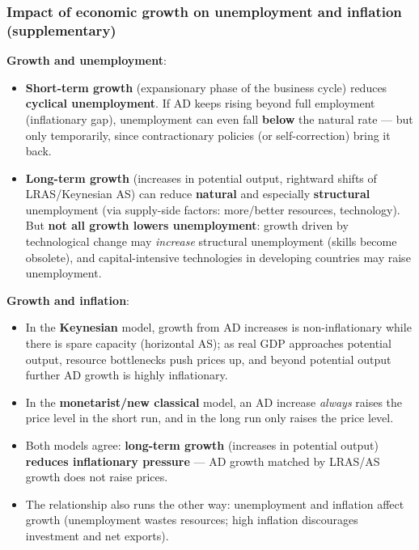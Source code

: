 \documentclass[a4paper,12pt]{article}
\begin{document}
\subsubsection*{Impact of economic growth on unemployment and inflation (supplementary)}
\textbf{Growth and unemployment}:
\begin{itemize}
  \item \textbf{Short-term growth} (expansionary phase of the business cycle) reduces \textbf{cyclical unemployment}. If AD keeps rising beyond full employment (inflationary gap), unemployment can even fall \textbf{below} the natural rate --- but only temporarily, since contractionary policies (or self-correction) bring it back.
  \item \textbf{Long-term growth} (increases in potential output, rightward shifts of LRAS/Keynesian AS) can reduce \textbf{natural} and especially \textbf{structural} unemployment (via supply-side factors: more/better resources, technology). But \textbf{not all growth lowers unemployment}: growth driven by technological change may \textit{increase} structural unemployment (skills become obsolete), and capital-intensive technologies in developing countries may raise unemployment.
\end{itemize}
\textbf{Growth and inflation}:
\begin{itemize}
  \item In the \textbf{Keynesian} model, growth from AD increases is non-inflationary while there is spare capacity (horizontal AS); as real GDP approaches potential output, resource bottlenecks push prices up, and beyond potential output further AD growth is highly inflationary.
  \item In the \textbf{monetarist/new classical} model, an AD increase \textit{always} raises the price level in the short run, and in the long run only raises the price level.
  \item Both models agree: \textbf{long-term growth} (increases in potential output) \textbf{reduces inflationary pressure} --- AD growth matched by LRAS/AS growth does not raise prices.
  \item The relationship also runs the other way: unemployment and inflation affect growth (unemployment wastes resources; high inflation discourages investment and net exports).
\end{itemize}
\end{document}
